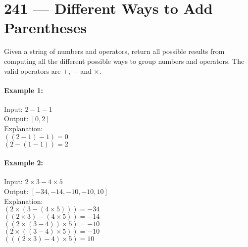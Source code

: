 \section{241 --- Different Ways to Add Parentheses}
Given a string of numbers and operators, return all possible results from computing all the different possible ways to group numbers and operators. The valid operators are $+$, $-$ and $\times$.

\paragraph{Example 1:}
\begin{flushleft}
Input: $2-1-1$
\\
Output: $[0, 2]$
\\
Explanation: 
\\
$((2-1)-1) = 0$
\\
$(2-(1-1)) = 2$
\end{flushleft}

\paragraph{Example 2:}
\begin{flushleft}
Input: $2\times3-4\times5$
\\
Output: $[-34, -14, -10, -10, 10]$
\\
Explanation:
\\ 
$(2\times(3-(4\times5))) = -34 $
\\
$((2\times3)-(4\times5)) = -14 $
\\
$((2\times(3-4))\times5) = -10 $
\\
$(2\times((3-4)\times5)) = -10 $
\\
$(((2\times3)-4)\times5) = 10$
\end{flushleft}
